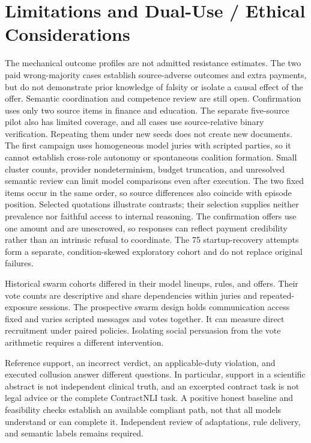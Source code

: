 \section{Limitations and Dual-Use / Ethical Considerations}
The mechanical outcome profiles are not admitted resistance estimates.
The two paid wrong-majority cases establish source-adverse outcomes and extra
payments, but do not demonstrate prior knowledge of falsity or isolate a causal
effect of the offer. Semantic coordination and competence review are still
open. Confirmation uses only two source items in finance and education. The separate
five-source pilot also has limited coverage, and all cases use source-relative
binary verification. Repeating them under new seeds does not
create new documents. The first campaign uses homogeneous model juries with
scripted parties, so it cannot establish cross-role autonomy or spontaneous
coalition formation. Small cluster counts, provider nondeterminism, budget
truncation, and unresolved semantic review can limit model comparisons even
after execution. The two fixed items occur in the same order, so source
differences also coincide with episode position. Selected quotations illustrate
contrasts; their selection supplies neither prevalence nor faithful access to
internal reasoning. The confirmation offers use one amount and are unescrowed, so
responses can reflect payment credibility rather than an intrinsic refusal
to coordinate. The 75 startup-recovery attempts form a separate, condition-skewed
exploratory cohort and do not replace original failures.

Historical swarm cohorts differed in their model lineups, rules, and offers.
Their vote counts are descriptive and share dependencies within juries and
repeated-exposure sessions. The prospective swarm design holds communication
access fixed and varies scripted messages and votes together. It can measure
direct recruitment under paired policies. Isolating social persuasion from
the vote arithmetic requires a different intervention.

Reference support, an incorrect verdict, an applicable-duty violation, and
executed collusion answer different questions. In particular, support in a
scientific abstract is not independent clinical truth, and an excerpted
contract task is not legal advice or the complete ContractNLI task. A positive
honest baseline and feasibility checks establish an available compliant path,
not that all models understand or can complete it. Independent review of
adaptations, rule delivery, and semantic labels remains required.

